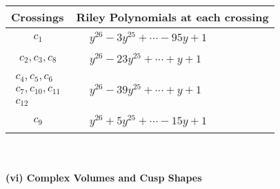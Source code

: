 \documentclass[1p]{elsarticle_modified}
\theoremstyle{definition}
\begin{document}
\begin{tabular}{m{50pt}|m{274pt}}
Crossings & \hspace{64pt}Riley Polynomials at each crossing \\
\hline $$\begin{aligned}c_{1}\end{aligned}$$&$\begin{aligned}
&y^{26}-3 y^{25}+\cdots-95 y+1
\end{aligned}$\\
\hline $$\begin{aligned}c_{2},c_{3},c_{8}\end{aligned}$$&$\begin{aligned}
&y^{26}-23 y^{25}+\cdots+y+1
\end{aligned}$\\
\hline $$\begin{aligned}c_{4},c_{5},c_{6}\\c_{7},c_{10},c_{11}\\c_{12}\end{aligned}$$&$\begin{aligned}
&y^{26}-39 y^{25}+\cdots+y+1
\end{aligned}$\\
\hline $$\begin{aligned}c_{9}\end{aligned}$$&$\begin{aligned}
&y^{26}+5 y^{25}+\cdots-15 y+1
\end{aligned}$\\
\hline
\end{tabular}\\~\\
\newpage\flushleft \textbf{(vi) Complex Volumes and Cusp Shapes}
\end{document}

